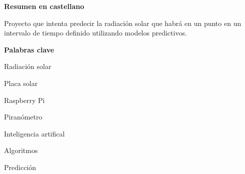 
\newpage

\thispagestyle{empty}

\begin{center}

{\bf \Huge Resumen en castellano}

  \end{center}
\vspace{1cm}

Proyecto que intenta predecir la radiación solar que habrá en un punto en un intervalo de tiempo definido utilizando modelos predictivos.

\vspace{1cm}

\begin{center}

{\bf \Large Palabras clave}
\vspace{1cm}

   Radiación solar
   \vspace{0.5cm}

   Placa solar
   \vspace{0.5cm}

   Raspberry Pi
   \vspace{0.5cm}

   Piranómetro
   \vspace{0.5cm}

   Inteligencia artifical
   \vspace{0.5cm}

   Algoritmos
   \vspace{0.5cm}

   Predicción
   \vspace{0.5cm}

   \end{center}

   \vspace{0.5cm}

   




   


